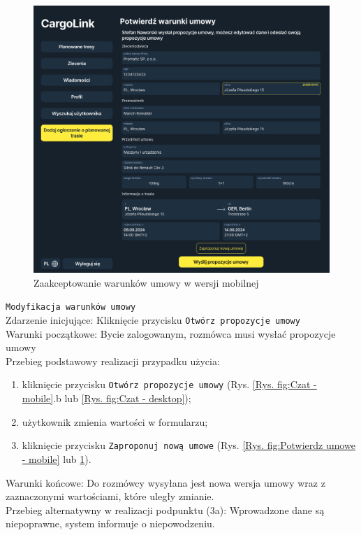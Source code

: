 \begin{figure}[H]
	\centering
		\includegraphics[width=0.7\linewidth]{rozdzial1/potwierdz_umowe_d.jpg}
	\caption{Zaakceptowanie warunków umowy w wersji mobilnej}
	\label{Rys. fig:Potwierdz umowe - desktop}
\end{figure}

\texttt{Modyfikacja warunków umowy} \\
Zdarzenie inicjujące: Kliknięcie przycisku \texttt{Otwórz propozycje umowy} \\
Warunki początkowe: Bycie zalogowanym, rozmówca musi wysłać propozycje umowy \\
Przebieg podstawowy realizacji przypadku użycia: \\
\begin{enumerate}
    \item kliknięcie przycisku \texttt{Otwórz propozycje umowy} (Rys. \ref{Rys. fig:Czat - mobile}.b lub \ref{Rys. fig:Czat - desktop});
    \item użytkownik zmienia wartości w formularzu;
    \item kliknięcie przycisku \texttt{Zaproponuj nową umowe} (Rys. \ref{Rys. fig:Potwierdz umowe - mobile} lub \ref{Rys. fig:Potwierdz umowe - desktop}).
\end{enumerate}
Warunki końcowe: Do rozmówcy wysyłana jest nowa wersja umowy wraz z zaznaczonymi wartościami, które uległy zmianie.\\
Przebieg alternatywny w realizacji podpunktu (3a): Wprowadzone dane są niepoprawne, system informuje o niepowodzeniu. \\

